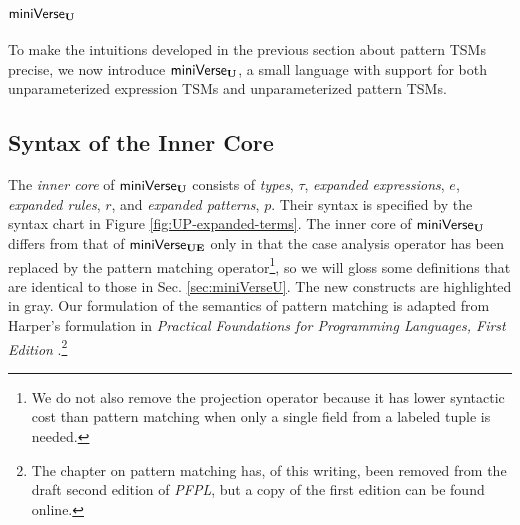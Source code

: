 {{{{\section{\texorpdfstring{$\mathsf{miniVerse}_\textbf{U}$}{miniVerseU}}\label{sec:miniVerseUP}
To make the intuitions developed in the previous section about pattern TSMs precise, we  now introduce $\mathsf{miniVerse}_\textbf{U}$, a small language with support for both unparameterized expression TSMs and unparameterized pattern TSMs.
\subsection{Syntax of the Inner Core}\label{sec:UP-expanded-terms}
The \emph{inner core} of $\mathsf{miniVerse}_\textbf{U}$ consists of \emph{types}, $\tau$, \emph{expanded expressions}, $e$, \emph{expanded rules}, $r$, and \emph{expanded patterns}, $p$. Their syntax is specified by the syntax chart in Figure \ref{fig:UP-expanded-terms}. The inner core of $\mathsf{miniVerse}_\textbf{U}$ differs from that of $\mathsf{miniVerse}_\textbf{UE}$  only in that the case analysis operator has been replaced by the pattern matching operator\footnote{We do not also remove the projection operator because it has lower syntactic cost than pattern matching when only a single field from a labeled tuple is needed.}, so we will gloss some definitions that are identical to those in Sec. \ref{sec:miniVerseU}. The new constructs are highlighted in gray. Our formulation of the semantics of pattern matching is adapted from Harper's formulation in \emph{Practical Foundations for Programming Languages, First Edition} \cite{pfple1}.\footnote{The chapter on pattern matching has, of this writing, been removed from the draft second edition of \emph{PFPL}, but a copy of the first edition can be found online.}

}}}}
